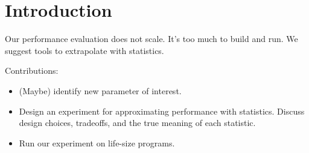 \section{Introduction}

Our performance evaluation does not scale.
It's too much to build and run.
We suggest tools to extrapolate with statistics.

Contributions:
\begin{itemize}
\item
  (Maybe) identify new parameter of interest.
\item
  Design an experiment for approximating performance with statistics.
  Discuss design choices, tradeoffs, and the true meaning of each statistic.
\item
  Run our experiment on life-size programs.
\end{itemize}
